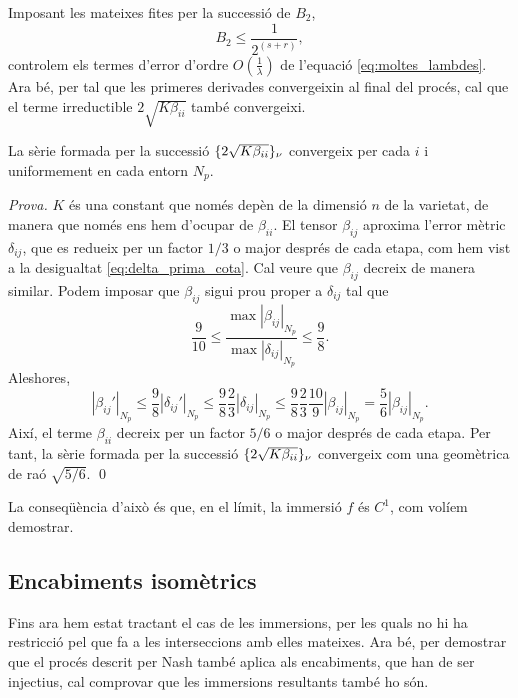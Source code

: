Imposant les mateixes fites per la successió de $B_2$, 
\begin{equation}
    B_2 \le \frac1{2^{(s+r)}},
\end{equation}
controlem els termes d'error d'ordre $O\left(\frac1{\lambda}\right)$ de l'equació \eqref{eq:moltes_lambdes}. Ara bé, per tal que les primeres derivades convergeixin al final del procés, cal que el terme irreductible $2\sqrt{K\beta_{ii}}$ també convergeixi.

\begin{prop}
    La sèrie formada per la successió $\{2\sqrt{K\beta_{ii}}\}_{\nu}$ convergeix per cada $i$ i uniformement en cada entorn $N_p$.
\end{prop}
{
\color{black!50!green} \textit{Prova.} 
$K$ és una constant que només depèn de la dimensió $n$ de la varietat, de manera que només ens hem d'ocupar de $\beta_{ii}$.
El tensor $\beta_{ij}$ aproxima l'error mètric $\delta_{ij}$, que es redueix per un factor $1/3$ o major després de cada etapa, com hem vist a la desigualtat \eqref{eq:delta_prima_cota}. Cal veure que $\beta_{ij}$ decreix de manera similar. Podem imposar que $\beta_{ij}$ sigui prou proper a $\delta_{ij}$ tal que 
\begin{equation}
    \frac{9}{10} \le \frac{\max|\beta_{ij}|_{N_p}}{\max|\delta_{ij}|_{N_p}} \le \frac{9}{8}.
\end{equation}
Aleshores,
\begin{equation}
    |\beta_{ij}'|_{N_p} \le \frac{9}{8}|\delta_{ij}'|_{N_p}\le \frac{9}{8}\frac{2}{3}|\delta_{ij}|_{N_p} \le \frac{9}{8}\frac{2}{3}\frac{10}{9}|\beta_{ij}|_{N_p} =  \frac{5}{6}|\beta_{ij}|_{N_p}.
\end{equation}
Així, el terme $\beta_{ii}$ decreix per un factor $5/6$ o major després de cada etapa. Per tant, la sèrie formada per la successió $\{2\sqrt{K\beta_{ii}}\}_{\nu}$ convergeix com una geomètrica de raó $\sqrt{5/6}$. \qed
}

\begin{obs}
    La conseqüència d'això és que, en el límit, la immersió $f$ és $C^1$, com volíem demostrar.
\end{obs}

\subsection{Encabiments isomètrics}

Fins ara hem estat tractant el cas de les immersions, per les quals no hi ha restricció pel que fa a les interseccions amb elles mateixes. Ara bé, per demostrar que el procés descrit per Nash també aplica als encabiments, que han de ser injectius, cal comprovar que les immersions resultants també ho són.

